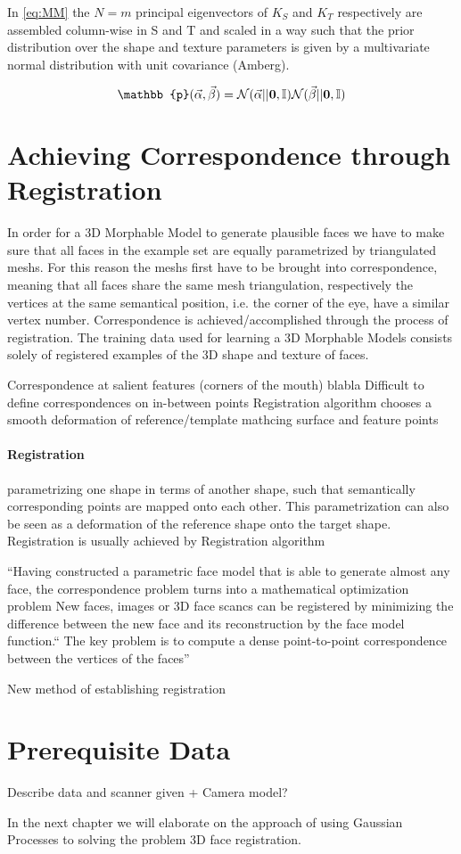 In \eqref{eq:MM} the $N=m$ principal eigenvectors of $K_{S}$ and $K_{T}$ respectively are assembled column-wise in S and T and scaled in a way such that the prior distribution over the shape and texture parameters is given by a multivariate normal distribution with unit covariance (Amberg).

\begin{equation}
    \mathbb{p}(\vec\alpha, \vec\beta) = \mathcal{N}(\vec\alpha\vert|\vect{0}, \mathbb{I})\mathcal{N}(\vec\beta\vert|\vect{0}, \mathbb{I})
\end{equation}

\section{Achieving Correspondence through Registration}
In order for a 3D Morphable Model to generate plausible faces we have to make sure that all faces in the example set are equally parametrized by triangulated meshs. For this reason the meshs first have to be brought into correspondence, meaning that all faces share the same mesh triangulation, respectively the vertices at the same semantical position, i.e. the corner of the eye, have a similar vertex number. Correspondence is achieved/accomplished through the process of registration. 
The training data used for learning a 3D Morphable Models consists solely of registered examples of the 3D shape and texture of faces.

Correspondence at salient features (corners of the mouth) blabla
Difficult to define correspondences on in-between points
Registration algorithm chooses a smooth deformation of reference/template mathcing surface and feature points
\paragraph{Registration}
parametrizing one shape in terms of another shape, such that semantically corresponding points are mapped onto each other. This parametrization can also be seen as a deformation of the reference shape onto the target shape.
Registration is usually achieved by 
Registration algorithm

``Having constructed a parametric face model that is able to generate almost any face, the correspondence problem turns into a mathematical optimization problem
New faces, images or 3D face scancs can be registered by minimizing the difference between the new face and its reconstruction by the face model function.``
The key problem is to compute a dense point-to-point correspondence between the vertices of the faces''

New method of establishing registration

\section{Prerequisite Data}
Describe data and scanner given + Camera model?

In the next chapter we will elaborate on the approach of using Gaussian Processes to solving the problem 3D face registration.

\nopagebreak



